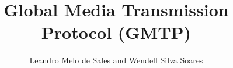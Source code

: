 \documentclass[12pt]{article}
\author{Leandro Melo de Sales and Wendell Silva Soares}
\title{Global Media Transmission Protocol (GMTP)}
\begin{document}
 \maketitle
 \nocite{sales2014gmtp}
 
   
 
\end{document}
